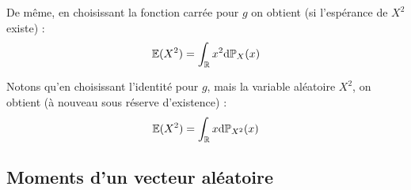 \documentclass[../integ-proba.tex]{subfiles}
\begin{document}
\begin{exemple}
    De même, en choisissant la fonction carrée pour $g$ on obtient (si l'espérance de $X^2$ existe) :
    $$
    \mathbb{E}(X^2) = \int_\mathbb{R} x^2\textnormal{d}\mathbb{P}_X(x)
    $$

    Notons qu'en choisissant l'identité pour $g$, mais la variable aléatoire $X^2$, on obtient (à nouveau sous réserve d'existence) :
    $$
    \mathbb{E}(X^2) = \int_\mathbb{R} x\textnormal{d}\mathbb{P}_{X^2}(x)
    $$
\end{exemple}

\subsection{Moments d'un vecteur aléatoire}
\end{document}
